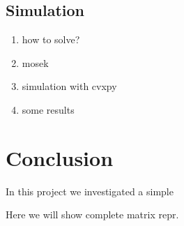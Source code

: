 \documentclass[lettersize,journal]{IEEEtran}
\begin{document}
\subsection{Simulation}
\begin{enumerate}
\item{how to solve?}
\item{mosek}
\item{simulation with cvxpy}
\item{some results}
\end{enumerate}
\section{Conclusion}
In this project we investigated a simple

{
Here we will show complete matrix repr.
}



\end{document}
